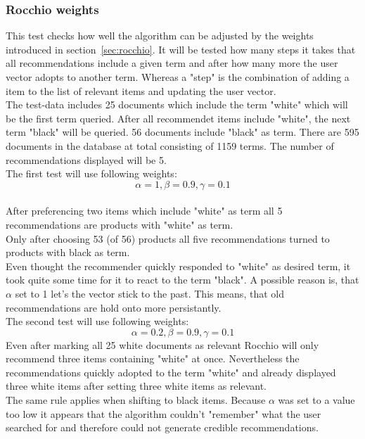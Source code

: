 \subsubsection{Rocchio weights}
\label{sec:rocchio-weights}
This test checks how well the algorithm can be adjusted by the weights introduced in section~\ref{sec:rocchio}.
It will be tested how many steps it takes that all recommendations include a given term and after how many more the user vector adopts to another term.
Whereas a "step" is the combination of adding a item to the list of relevant items and updating the user vector.
\\
The test-data includes 25 documents which include the term "white" which will be the first term queried.
After all recommendet items include "white", the next term "black" will be queried.
56 documents include "black" as term.
There are 595 documents in the database at total consisting of 1159 terms.
The number of recommendations displayed will be 5.
\\

\noindent
The first test will use following weights:
\\
$$\alpha = 1, \beta = 0.9, \gamma = 0.1$$
\\
After preferencing two items which include "white" as term all 5 recommendations are products with "white" as term.
\\
Only after choosing 53 (of 56) products all five recommendations turned to products with black as term.
\\
Even thought the recommender quickly responded to "white" as desired term, it took quite some time for it to react to the term "black".
A possible reason is, that $\alpha$ set to 1 let's the vector stick to the past.
This means, that old recommendations are hold onto more persistantly.
\\

\noindent
The second test will use following weights:
\\
$$\alpha = 0.2, \beta = 0.9, \gamma = 0.1$$
Even after marking all 25 white documents as relevant Rocchio will only recommend three items containing "white" at once.
Nevertheless the recommendations quickly adopted to the term "white" and already displayed three white items after setting three white items as relevant.
\\
The same rule applies when shifting to black items.
Because $\alpha$ was set to a value too low it appears that the algorithm couldn't "remember" what the user searched for and therefore could not generate credible recommendations.
\\

